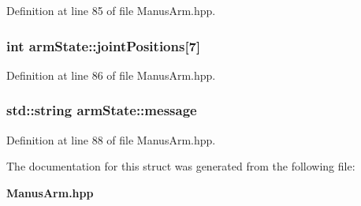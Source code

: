 \-Definition at line 85 of file \-Manus\-Arm.\-hpp.

\subsubsection[{joint\-Positions}]{\setlength{\rightskip}{0pt plus 5cm}int {\bf arm\-State\-::joint\-Positions}[7]}\label{structarmState_a7e9e18c429323ecabf773a070c6d4eba}


\-Definition at line 86 of file \-Manus\-Arm.\-hpp.

\subsubsection[{message}]{\setlength{\rightskip}{0pt plus 5cm}std\-::string {\bf arm\-State\-::message}}\label{structarmState_a217a56d5c4b7101f25667601ce1b1dd7}


\-Definition at line 88 of file \-Manus\-Arm.\-hpp.



\-The documentation for this struct was generated from the following file\-:\begin{DoxyCompactItemize}
\item 
{\bf \-Manus\-Arm.\-hpp}\end{DoxyCompactItemize}
